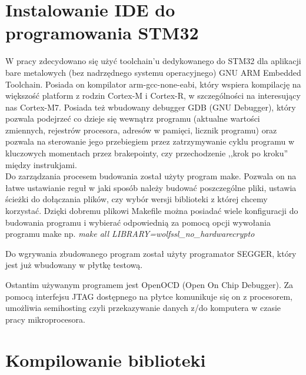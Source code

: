 \documentclass[oneside]{mgr}
\begin{document}
\section{Instalowanie IDE do programowania STM32}

W pracy zdecydowano się użyć toolchain'u dedykowanego do STM32 dla aplikacji bare metalowych (bez nadrzędnego systemu operacyjnego) GNU ARM Embedded Toolchain. Posiada on kompilator arm-gcc-none-eabi, który wspiera kompilację na większość platform z rodzin Cortex-M i Cortex-R, w szczególności na interesujący nas Cortex-M7. Posiada też wbudowany debugger GDB (GNU Debugger), który pozwala podejrzeć co dzieje się wewnątrz programu (aktualne wartości zmiennych, rejestrów procesora, adresów w pamięci, licznik programu) oraz pozwala na sterowanie jego przebiegiem przez zatrzymywanie cyklu programu w kluczowych momentach przez brakepointy, czy przechodzenie ,,krok po kroku'' między instrukjami.\\
Do zarządzania procesem budowania został użyty program make. Pozwala on na łatwe ustawianie reguł w jaki sposób należy budować poszczególne pliki, ustawia ścieżki do dołączania plików, czy wybór wersji biblioteki z której chcemy korzystać. Dzięki dobremu plikowi Makefile można posiadać wiele konfiguracji do budowania programu i wybierać odpowiednią za pomocą opcji wywołania programu make np. \textit{make all LIBRARY=wolfssl\_no\_hardwarecrypto }

Do wgrywania zbudowanego program został użyty programator SEGGER, który jest już wbudowany w płytkę testową.

Ostantim używanym programem jest OpenOCD (Open On Chip Debugger). Za pomocą interfejsu JTAG dostępnego na płytce komunikuje się on z procesorem, umożliwia semihosting czyli przekazywanie danych z/do komputera w czasie pracy mikroprocesora.

\section{Kompilowanie biblioteki}
\end{document}
